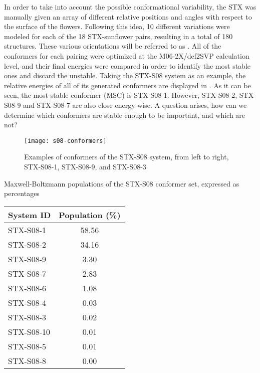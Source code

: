 In order to take into account the possible conformational variability, the STX was manually given an array of different relative positions and angles with respect to the surface of the flowers.
Following this idea, 10 different variations were modeled for each of the 18 STX-sunflower pairs, resulting in a total of 180 structures.
These various orientations will be referred to as .
All of the conformers for each pairing were optimized at the M06-2X/def2SVP calculation level, and their final energies were compared in order to identify the most stable ones and discard the unstable.
Taking the STX-S08 system as an example, the relative energies of all of its generated conformers are displayed in .
As it can be seen, the most stable conformer (MSC) is STX-S08-1.
However, STX-S08-2, STX-S08-9 and STX-S08-7 are also close energy-wise.
A question arises, how can we determine which conformers are stable enough to be important, and which are not?

\begin{figure}
    \texttt{[image: s08-conformers]}
    \caption[Conformers of STX-S08]{Examples of conformers of the STX-S08 system, from left to right, STX-S08-1, STX-S08-9, and STX-S08-3}
\end{figure}

\begin{margintable}
    \centering
    \caption[Maxwell-Boltzmann populations of STX-S08]{Maxwell-Boltzmann populations of the STX-S08 conformer set, expressed as percentages}
    \begin{tabular}{@{}l
                       S[table-format=2.2]@{}}
        \toprule
        System ID & {Population (\si{\percent})} \\
        \midrule
        STX-S08-1 & 58.56 \\
        STX-S08-2 & 34.16 \\
        STX-S08-9 & 3.30 \\
        STX-S08-7 & 2.83 \\
        STX-S08-6 & 1.08 \\
        STX-S08-4 & 0.03 \\
        STX-S08-3 & 0.02 \\
        STX-S08-10 & 0.01 \\
        STX-S08-5 & 0.01 \\
        STX-S08-8 & 0.00 \\
    \end{tabular}
\end{margintable}

